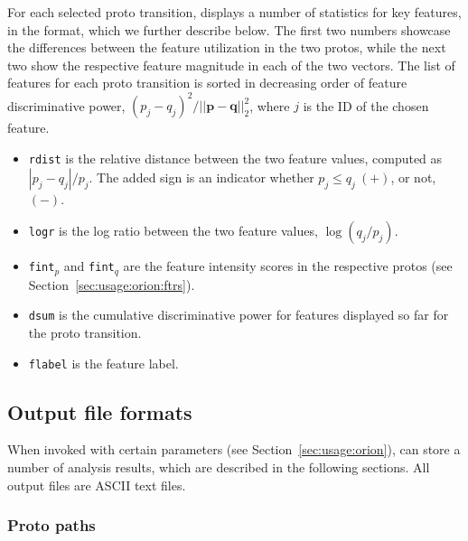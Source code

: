 \documentclass[]{article}
\def\vec#1{{\mathbf{\boldsymbol #1}}}
\begin{document}
For each selected proto transition, \orion displays a number of statistics for
key features, in the format,
\newline
which we further describe below. The first two numbers showcase the
differences between the feature utilization in the two protos, while the next
two show the respective feature magnitude in each of the two vectors. The list
of features for each proto transition is sorted in decreasing order of feature
discriminative power, $(p_j-q_j)^2 / ||\vec p - \vec q||_2^2$, where $j$ is the
ID of the chosen feature.
\begin{itemize}
  \item {\tt rdist} is the relative distance between the two feature values,
  computed as $|p_j - q_j|/p_j$. The added sign is an indicator
  whether $p_j \le q_j\ (+)$, or not, $(-)$.

  \item {\tt logr} is the log ratio between the two feature values,
  $\log(q_j/p_j)$.

  \item {\tt fint$_p$} and {\tt fint$_q$} are the feature intensity scores in
  the respective protos (see Section~\ref{sec:usage:orion:ftrs}).

  \item  {\tt dsum} is the cumulative discriminative power for features
  displayed so far for the proto transition.

  \item  {\tt flabel} is the feature label.
\end{itemize}

\subsection{Output file formats}
\label{sec:usage:oformat}

When invoked with certain parameters (see Section~\ref{sec:usage:orion}), \orion
can store a number of analysis results, which are described in the following
sections. All output files are ASCII text files.

\subsubsection{Proto paths}
\label{sec:usage:oformat:paths}
\end{document}
